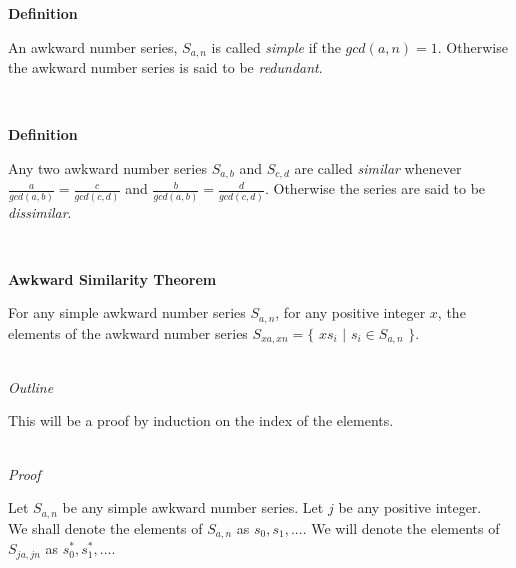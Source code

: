 \documentclass[a4paper,12pt]{article}
\begin{document}
\label{definition:simple_and_redundant_series}
\hypertarget{definition:simple_and_redundant_series}{}
\begin{tcolorbox}
\textbf{Definition}

An awkward number series, $S_{a,n}$ is called \textit{simple} if the $gcd(a,n) = 1$. Otherwise the awkward number series is said to be \textit{redundant}.

\end{tcolorbox}
\noindent \\









\label{definition:similar_series}
\hypertarget{definition:similar_series}{}
\begin{tcolorbox}
\textbf{Definition}

Any two awkward number series $S_{a,b}$ and $S_{c,d}$ are called \textit{similar} whenever $\frac{a}{gcd(a,b)} = \frac{c}{gcd(c,d)}$ and $\frac{b}{gcd(a,b)} = \frac{d}{gcd(c,d)}$. Otherwise the series are said to be \textit{dissimilar}.

\end{tcolorbox}
\noindent \\







\label{theorem:similar_theorem}
\hypertarget{theorem:similar_theorem}{}
\begin{tcolorbox}
\textbf{Awkward Similarity Theorem}

\noindent For any simple awkward number series $S_{a, n}$, for any positive integer $x$, the elements of the awkward number series $S_{xa, xn} = \{$ $xs_i$ $|$ $s_i \in S_{a,n}$ $\}$.
\end{tcolorbox}

\noindent \\
\textit{Outline}

\noindent This will be a proof by induction on the index of the elements.

\noindent \\
\textit{Proof}

\noindent Let $S_{a,n}$ be any simple awkward number series. Let $j$ be any positive integer.\\

\noindent We shall denote the elements of $S_{a,n}$ as $s_0, s_1, ...$. We will denote the elements of $S_{ja, jn}$ as $s^*_0, s^*_1, ...$.
\end{document}
